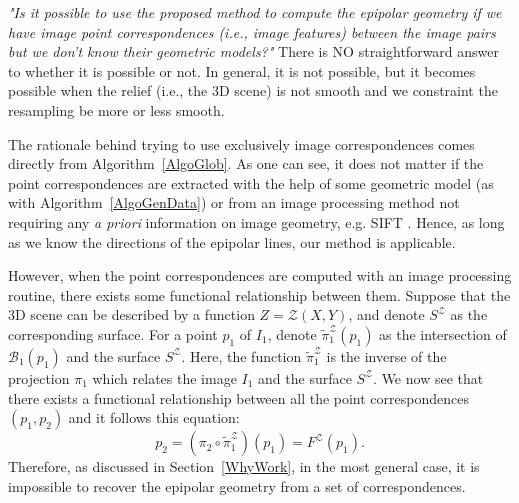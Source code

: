 \documentclass{ipol}
\newcommand{\Bund}[1]{\ensuremath{\mathcal{B}_{#1}}}
\newcommand{\BundO}{\Bund{1}}
\newcommand{\PiZVert}{\widetilde{\pi}_1^{\mathcal{Z}} }
\newcommand{\er}[1]{\textcolor{orange}{#1}}
\begin{document}
\emph{"Is it possible to use
the proposed method to compute the epipolar geometry
if we have image point correspondences (i.e., image features) between the image pairs but we don't know their geometric models?"} There is {NO}
 straightforward answer to whether it is possible or not. In general, it is not possible,
but it becomes possible when the relief (i.e., the 3D scene) is not smooth and we constraint the resampling be more or less smooth.
%

The rationale behind trying to use exclusively image correspondences comes directly from Algorithm~\ref{AlgoGlob}. As one can see, it does not matter if the point correspondences are extracted with the help of some geometric model (as with Algorithm~\ref{AlgoGenData}) or from an image processing method not requiring any
\emph{a priori} information on image geometry, e.g. SIFT \cite{lowe2004distinctive}. Hence, as long as we know the directions of the epipolar lines, our method is applicable.

However, when the point correspondences are computed with an image processing routine,
 there exists some functional relationship between them. Suppose that the 3D scene can be described by a function $Z=\mathcal{Z}(X,Y)$, and denote $S^\mathcal{Z}$ as the corresponding surface. For a point $p_1$ of $I_1$, denote $ \PiZVert (p_1)$ as the intersection of  $\BundO(p_1)$ and the surface  $S^\mathcal{Z}$. Here, the function $\PiZVert$ is the inverse of the projection  $\pi_1$ which relates the image $I_1$ and the surface $S^\mathcal{Z}$. We now see that there exists a functional relationship between all the point correspondences $(p_1,p_2)$ and it follows this equation:
\begin{equation}
   p_2 = (\pi_2 \circ  \PiZVert) (p_1) = F^\mathcal{Z}(p_1).
\end{equation}
Therefore, as discussed in Section~\ref{WhyWork}, in the most general
case, it is impossible to recover the epipolar geometry from a set of correspondences.
%
\end{document}
